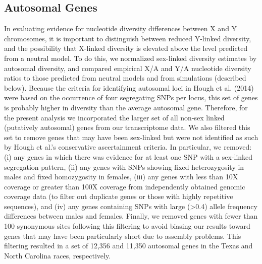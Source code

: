 \documentclass[9pt,twocolumn,twoside]{gsajnl}
\begin{document}
\subsection*{Autosomal Genes}
In evaluating evidence for nucleotide diversity differences between X and Y chromosomes, it is important to distinguish between reduced Y-linked diversity, and the possibility that X-linked diversity is elevated above the level predicted from a neutral model. To do this, we normalized sex-linked diversity estimates by autosomal diversity, and compared empirical X/A and Y/A nucleotide diversity ratios to those predicted from neutral models and from simulations (described below). Because the criteria for identifying autosomal loci in Hough et al. (2014) were based on the occurrence of four segregating SNPs per locus, this set of genes is probably higher in diversity than the average autosomal gene. Therefore, for the present analysis we incorporated the larger set of all non-sex linked (putatively autosomal) genes from our transcriptome data. We also filtered this set to remove genes that may have been sex-linked but were not identified as such by Hough et al.'s conservative ascertainment criteria. In particular, we removed: (i) any genes in which there was evidence for at least one SNP with a sex-linked segregation pattern, (ii) any genes with SNPs showing fixed heterozygosity in males and fixed homozygosity in females, (iii) any genes with less than 10X coverage or greater than 100X coverage from independently obtained genomic coverage data (to filter out duplicate genes or those with highly repetitive sequences), and (iv) any genes containing SNPs with large (>0.4) allele frequency differences between males and females. Finally, we removed genes with fewer than 100 synonymous sites following this filtering to avoid biasing our results toward genes that may have been particularly short due to assembly problems. This filtering resulted in a set of 12,356 and 11,350 autosomal genes in the Texas and North Carolina races, respectively.
\end{document}
